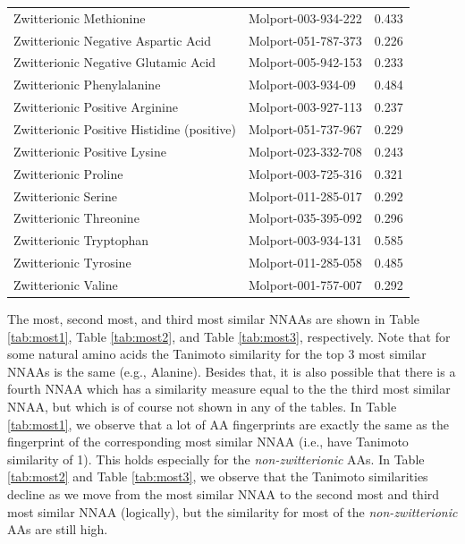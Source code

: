 \documentclass[a4paper,11pt]{article}\usepackage[]{graphicx}\usepackage[]{xcolor}
\begin{document}
\begin{enumerate}
\begin{table}[H]
\begin{tabular}[t]{llr}
Zwitterionic Methionine & Molport-003-934-222 & 0.433\\
Zwitterionic Negative Aspartic Acid & Molport-051-787-373 & 0.226\\
Zwitterionic Negative Glutamic Acid & Molport-005-942-153 & 0.233\\
Zwitterionic Phenylalanine & Molport-003-934-09 & 0.484\\
Zwitterionic Positive Arginine & Molport-003-927-113 & 0.237\\
Zwitterionic Positive Histidine (positive) & Molport-051-737-967 & 0.229\\
Zwitterionic Positive Lysine & Molport-023-332-708 & 0.243\\
Zwitterionic Proline & Molport-003-725-316 & 0.321\\
Zwitterionic Serine & Molport-011-285-017 & 0.292\\
Zwitterionic Threonine & Molport-035-395-092 & 0.296\\
Zwitterionic Tryptophan & Molport-003-934-131 & 0.585\\
Zwitterionic Tyrosine & Molport-011-285-058 & 0.485\\
Zwitterionic Valine & Molport-001-757-007 & 0.292\\
\bottomrule
\end{tabular}
\end{table} \captionsetup{margin = 55pt}


The most, second most, and third most similar NNAAs are shown in Table \ref{tab:most1}, Table \ref{tab:most2}, and Table \ref{tab:most3}, respectively. Note that for some natural amino acids the Tanimoto similarity for the top 3 most similar NNAAs is the same (e.g., Alanine). Besides that, it is also possible that there is a fourth NNAA which has a similarity measure equal to the the third most similar NNAA, but which is of course not shown in any of the tables. In Table \ref{tab:most1}, we observe that a lot of AA fingerprints are exactly the same as the fingerprint of the corresponding most similar NNAA (i.e., have Tanimoto similarity of 1). This holds especially for the \textit{non-zwitterionic} AAs. In Table \ref{tab:most2} and Table \ref{tab:most3}, we observe that the Tanimoto similarities decline as we move from the most similar NNAA to the second most and third most similar NNAA (logically), but the similarity for most of the \textit{non-zwitterionic} AAs are still high. 





\end{enumerate}
\end{document}
